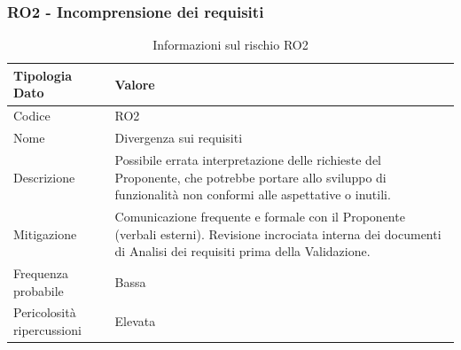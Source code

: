 \documentclass[a4paper,12pt]{article}
\begin{document}
\subsubsection{RO2 - Incomprensione dei requisiti}
\begin{table}[H]
    \centering
    \renewcommand{\arraystretch}{1.4}
    \begin{tabularx}{\textwidth}{|L|Z|}
        \hline
        \textbf{Tipologia Dato} & \textbf{Valore} \\
        \hline
        Codice & RO2 \\
        \hline
        Nome & Divergenza sui requisiti \\
        \hline
        Descrizione & Possibile errata interpretazione delle richieste del Proponente, che potrebbe portare allo sviluppo di funzionalità non conformi alle aspettative o inutili. \\
        \hline
        Mitigazione & Comunicazione frequente e formale con il Proponente (verbali esterni). Revisione incrociata interna dei documenti di Analisi dei requisiti prima della Validazione. \\
        \hline
        Frequenza probabile & Bassa \\
        \hline
        Pericolosità ripercussioni & Elevata \\
        \hline
    \end{tabularx}
    \caption{Informazioni sul rischio RO2}
    \label{tab:RO2}
\end{table}
\end{document}
